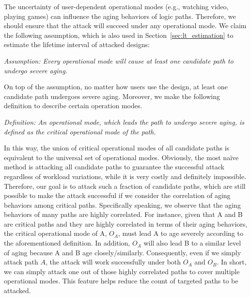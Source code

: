 The uncertainty of user-dependent operational modes (e.g., watching video, playing games) can influence the aging behaviors of logic paths. Therefore, we should ensure that the attack will succeed under any operational mode. We claim the following assumption, which is also used in Section~\ref{sec:lt_estimation} to estimate the lifetime interval of attacked designs:

{\setlength{\parskip}{3pt}
\noindent \textit{Assumption: Every operational mode will cause at least one candidate path to undergo severe aging.}

On top of the assumption, no matter how users use the design, at least one candidate path undergoes severe aging. 
Moreover, we make the following definition to describe certain operation modes.

\noindent \textit{Definition: An operational mode, which leads the path to undergo severe aging, is defined as the critical operational mode of the path.}
}

In this way, the union of critical operational modes of all candidate paths is equivalent to the universal set of operational modes. Obviously, the most na\"ive method is attacking all candidate paths to guarantee the successful attack regardless of workload variations, while it is very costly and definitely impossible. Therefore, our goal is to attack such a fraction of candidate paths, which are still possible to make the attack successful if we consider the correlation of aging behaviors among critical paths. Specifically speaking, we observe that the aging behaviors of many paths are highly correlated. For instance, given that A and B are critical paths and they are highly correlated in terms of their aging behaviors, the critical operational mode of A, $O_{A}$, must lead A to age severely according to the aforementioned definition. In addition, $O_{A}$ will also lead B to a similar level of aging because A and B age closely/similarly. Consequently, even if we simply attack path $A$, the attack will work successfully under both $O_{A}$ and $O_{B}$. In short, we can simply attack one out of those highly correlated paths to cover multiple operational modes. This feature helps reduce the count of targeted paths to be attacked.

